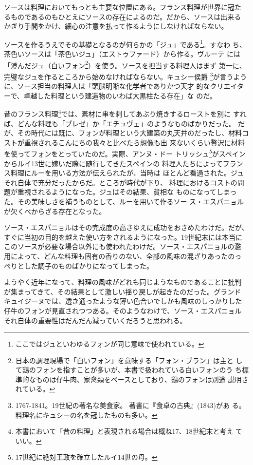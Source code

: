 \documentclass[twoside,12Q,b5paper,tombo]{escoffierltjsbook}
\begin{document}
ソースは料理においてもっとも主要な位置にある。フランス料理が世界に冠た
るものであるのもひとえにソースの存在によるのだ。だから、ソースは出来る
かぎり手間をかけ、細心の注意を払って作るようにしなければならない。

ソースを作るうえでその基礎となるのが何らかの「ジュ」である\footnote{ここではジュといわゆるフォンが同じ意味で使われている。}。すなわ
ち、茶色いソースは「茶色いジュ」（エストゥファード）から作る。ヴルーテ
には「澄んだジュ（白いフォン\footnote{日本の調理現場で「白いフォン」を意味する「フォン・ブラン」は主と
  して鶏のフォンを指すことが多いが、本書で扱われている白いフォンのう
  ち標準的なものは仔牛肉、家禽類をベースとしており、鶏のフォンは別途
  説明されている。}）を使う。ソースを担当する料理人はまず
第一に、完璧なジュを作るところから始めなければならない。キュシー侯爵
\footnote{1767-1841。19世紀の著名な美食家。
  著書に『食卓の古典』(1843)があ
  る。料理名にキュシーの名を冠したものも多い。}が言うように、ソース担当の料理人は「頭脳明晰な化学者でありかつ天才
的なクリエイターで、卓越した料理という建造物のいわば大黒柱たる存在」な
のだ。

昔のフランス料理\footnote{本書において「昔の料理」と表現される場合は概ね17、18世紀末と考え
  ていい。}では、素材に串を刺してあぶり焼きするローストを別に
すれば、どんな料理も「ブレゼ」か「エチュヴェ」のようなものばかりだった。
だが、その時代には既に、フォンが料理という大建築の丸天井のだったし、材料コストが重視されるこんにちの我々と比べたら想像も出
来ないくらい贅沢に材料を使ってフォンをとっていたのだ。実際、アンヌ・ドー
トリッシュ\footnote{17世紀に絶対王政を確立したルイ14世の母。}がスペインからルイ13世に嫁いだ際に随行してきたスペインの
料理人たちによってフランス料理にルーを用いる方法が伝えられたが、当時は
ほとんど看過された。ジュそれ自体で充分だったからだ。ところが時代が下り、
料理におけるコストの問題が重視されるようになった。ジュはその結果、貧相な
ものになってしまった。その美味しさを補うものとして、ルーを用いて作るソー
ス・エスパニョルが欠くべからざる存在となった。

ソース・エスパニョルはその完成度の高さゆえに成功をおさめたわけだ。だが、
すぐに当初の目的を越えた使い方をされるようになった。19世紀末には本当に
このソースが必要な場合以外にも使われたわけだ。ソース・エスパニョルの濫
用によって、どんな料理も固有の香りのない、全部の風味の混ざりあったのっ
ぺりとした調子のものばかりになってしまった。

ようやく近年になって、料理の風味がどれも同じようなものであることに批判
が集まってきて、その結果として激しい揺り戻しが起きたのだった。グランド
キュイジーヌでは、透き通ったような薄い色合いでしかも風味のしっかりした
仔牛のフォンが見直されつつある。そのようなわけで、ソース・エスパニョル
それ自体の重要性はだんだん減っていくだろうと思われる。
\end{document}
